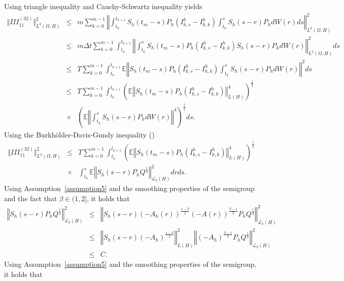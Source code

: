 \documentclass[review,12pt]{elsarticle}
\newcommand{\assref}[1]{{Assumption~\ref{#1}}}
\begin{document}
Using triangle inequality and Cauchy-Schwartz inequality yields
 \begin{eqnarray*}
 \Vert III_{11}^{(32)}\Vert^2_{L^2(\Omega, H)}
 &\leq& m\sum_{k=0}^{m-1}\left\Vert\int_{t_{k}}^{t_{k+1}}S_h(t_m-s)P_h\left(I^h_{k,s}-I^h_{k,k}\right)\int_{t_{k}}^sS_h(s-r)P_hdW(r)ds\right\Vert^2_{L^2(\Omega, H)}\nonumber\\
 &\leq& m\Delta t\sum_{k=0}^{m-1}\int_{t_{k}}^{t_{k+1}}\left\Vert\int_{t_{k}}^sS_h(t_m-s)P_h\left(I^h_{k,s}-I^h_{k,k}\right) S_h(s-r)P_hdW(r)\right\Vert^2_{L^2(\Omega, H)}ds\nonumber\\
 &\leq& T \sum_{k=0}^{m-1}\int_{t_{k}}^{t_{k+1}}\mathbb{E}
 \left\Vert S_h(t_m-s)P_h\left(I^h_{k,s}-I^h_{k,k}\right)\int_{t_{k}}^s S_h(s-r)P_hdW(r)\right\Vert^2ds\nonumber\\
 &\leq& T \sum_{k=0}^{m-1}\int_{t_{k}}^{t_{k+1}}\left(\mathbb{E}
 \left\Vert S_h(t_m-s)P_h\left(I^h_{k,s}-I^h_{k,k}\right)\right\Vert^4_{L(H)}\right)^{\frac{1}{2}}\nonumber\\
 &\times&\left(\mathbb{E}\left\Vert\int_{t_{k}}^s  S_h(s-r)P_hdW(r)\right\Vert^4\right)^{\frac{1}{2}} ds.
 \end{eqnarray*}
Using the Burkh\"{o}lder-Davis-Gundy inequality (\cite[Lemma 5.1]{Raphael})
 \begin{eqnarray}
 \label{mach5}
 \Vert III_{11}^{(32)}\Vert^2_{L^2(\Omega, H)}
 &\leq& T \sum_{k=0}^{m-1}\int_{t_{k}}^{t_{k+1}}\left(\mathbb{E}
 \left\Vert S_h(t_m-s)P_h\left(I^h_{k,s}-I^h_{k,k}\right)\right\Vert^4_{L(H)}\right)^{\frac{1}{2}}\nonumber\\
 &\times&\int_{t_{k}}^s \mathbb{E}\left\Vert S_h(s-r)P_hQ^{\frac{1}{2}}\right\Vert^2_{\mathcal{L}_2(H)} dr ds.
 \end{eqnarray}
 Using \assref{assumption5} and the smoothing properties of the semigroup and the fact that $\beta\in(1, 2]$, it holds that
 \begin{eqnarray}
 \label{mach6a}
 \left\Vert S_h(s-r)P_hQ^{\frac{1}{2}}\right\Vert^2_{\mathcal{L}_2(H)}
 &\leq&\left\Vert S_h(s-r)(-A_h(r))^{\frac{1-\beta}{2}}(-A(r))^{\frac{\beta-1}{2}} P_hQ^{\frac{1}{2}}\right\Vert^2_{\mathcal{L}_2(H)}\nonumber\\
 &\leq& \left\Vert S_h(s-r)(-A_h)^{\frac{1-\beta}{2}}\right\Vert^2_{L(H)}\left\Vert (-A_h)^{\frac{\beta-1}{2}} P_hQ^{\frac{1}{2}}\right\Vert^2_{\mathcal{L}_2(H)}\nonumber\\
 &\leq& C.
 \end{eqnarray}
 Using \assref{assumption5} and the smoothing properties of the semigroup, it holds that
\end{document}
